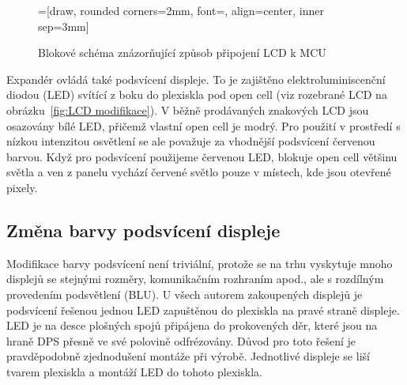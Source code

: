\begin{figure}[htbp]
    \centering
    =[draw, rounded corners=2mm, font={\bfseries}, align=center, inner sep=3mm]
    \caption{Blokové schéma znázorňující způsob připojení LCD k MCU}
    \label{fig:LCD blok}
\end{figure}


Expandér ovládá také podsvícení displeje. To je zajištěno elektroluminiscenční
diodou (LED) svítící z boku do plexiskla pod open cell (viz rozebrané LCD na
obrázku~\vref{fig:LCD modifikace}). V běžně prodávaných znakových LCD jsou
osazovány bílé LED, přičemž vlastní open cell je modrý. Pro použití
v prostředí s nízkou intenzitou osvětlení se ale považuje za vhodnější
podsvícení červenou barvou. Když pro
podsvícení použijeme červenou LED, blokuje open cell většinu světla a ven
z panelu vychází červené světlo pouze v místech, kde jsou otevřené pixely.

\subsection{Změna barvy podsvícení displeje}
Modifikace barvy podsvícení není triviální, protože se na trhu vyskytuje mnoho
displejů se stejnými rozměry, komunikačním rozhraním apod., ale s rozdílným
provedením podsvětlení (BLU). U všech autorem zakoupených displejů je
podsvícení řešenou jednou LED zapuštěnou do plexiskla na pravé straně displeje.
LED je na desce plošných spojů připájena do prokovených děr, které jsou na
hraně DPS přesně ve své polovině odfrézovány. Důvod pro toto řešení je
pravděpodobně zjednodušení montáže při výrobě. Jednotlivé displeje se liší
tvarem plexiskla a montáží LED do tohoto plexiskla.

